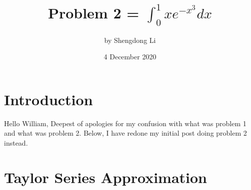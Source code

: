 \documentclass[12pt]{article}
\begin{document}
\title{Problem 2 = $\int_{0}^{1}xe^{-x^{3}}dx$}
\author{by Shengdong Li}
\date{4 December 2020}
\maketitle

\section{Introduction}
Hello William, 
Deepest of apologies for my confusion with what was problem 1 and what was problem 2. Below, I have redone my initial post doing problem 2 instead.

\section{Taylor Series Approximation}
\end{document}
